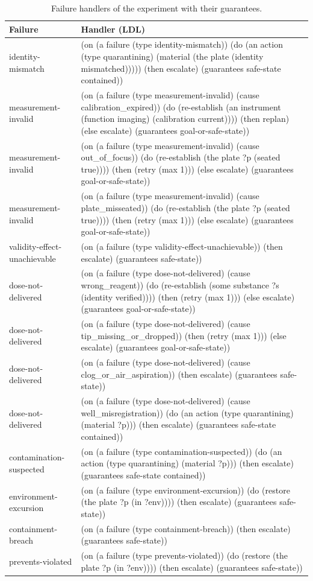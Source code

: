\documentclass[10pt,a4paper]{article}
\begin{document}
\begin{table}[tbp]\centering\small
\caption{Failure handlers of the experiment with their guarantees.}\label{tab:handlers}
\begin{tabularx}{\linewidth}{lX}\toprule
\textbf{Failure} & \textbf{Handler (LDL)} \\\midrule
identity-mismatch & (on (a failure (type identity-mismatch)) (do (an action (type quarantining) (material (the plate (identity mismatched))))) (then escalate) (guarantees safe-state contained)) \\
measurement-invalid & (on (a failure (type measurement-invalid) (cause calibration\_expired)) (do (re-establish (an instrument (function imaging) (calibration current)))) (then replan) (else escalate) (guarantees goal-or-safe-state)) \\
measurement-invalid & (on (a failure (type measurement-invalid) (cause out\_of\_focus)) (do (re-establish (the plate ?p (seated true)))) (then (retry (max 1))) (else escalate) (guarantees goal-or-safe-state)) \\
measurement-invalid & (on (a failure (type measurement-invalid) (cause plate\_misseated)) (do (re-establish (the plate ?p (seated true)))) (then (retry (max 1))) (else escalate) (guarantees goal-or-safe-state)) \\
validity-effect-unachievable & (on (a failure (type validity-effect-unachievable)) (then escalate) (guarantees safe-state)) \\
dose-not-delivered & (on (a failure (type dose-not-delivered) (cause wrong\_reagent)) (do (re-establish (some substance ?s (identity verified)))) (then (retry (max 1))) (else escalate) (guarantees goal-or-safe-state)) \\
dose-not-delivered & (on (a failure (type dose-not-delivered) (cause tip\_missing\_or\_dropped)) (then (retry (max 1))) (else escalate) (guarantees goal-or-safe-state)) \\
dose-not-delivered & (on (a failure (type dose-not-delivered) (cause clog\_or\_air\_aspiration)) (then escalate) (guarantees safe-state)) \\
dose-not-delivered & (on (a failure (type dose-not-delivered) (cause well\_misregistration)) (do (an action (type quarantining) (material ?p))) (then escalate) (guarantees safe-state contained)) \\
contamination-suspected & (on (a failure (type contamination-suspected)) (do (an action (type quarantining) (material ?p))) (then escalate) (guarantees safe-state contained)) \\
environment-excursion & (on (a failure (type environment-excursion)) (do (restore (the plate ?p (in ?env)))) (then escalate) (guarantees safe-state)) \\
containment-breach & (on (a failure (type containment-breach)) (then escalate) (guarantees safe-state)) \\
prevents-violated & (on (a failure (type prevents-violated)) (do (restore (the plate ?p (in ?env)))) (then escalate) (guarantees safe-state)) \\\bottomrule
\end{tabularx}
\end{table}
\end{document}
